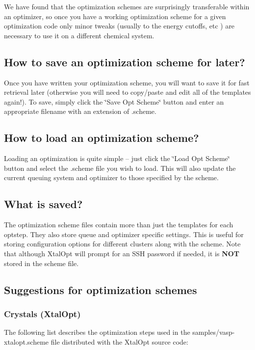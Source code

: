 We have found that the optimization schemes are surprisingly transferable within an optimizer, so once you have a working optimization scheme for a given optimization code only minor tweaks (usually to the energy cutoffs, etc ) are necessary to use it on a different chemical system.\hypertarget{optschemes_saving}{}\subsection{How to save an optimization scheme for later?}\label{optschemes_saving}
Once you have written your optimization scheme, you will want to save it for fast retrieval later (otherwise you will need to copy/paste and edit all of the templates again!). To save, simply click the \char`\"{}\+Save Opt
\+Scheme\char`\"{} button and enter an appropriate filename with an extension of .scheme.\hypertarget{optschemes_loading}{}\subsection{How to load an optimization scheme?}\label{optschemes_loading}
Loading an optimization is quite simple -- just click the \char`\"{}\+Load Opt
\+Scheme\char`\"{} button and select the .scheme file you wish to load. This will also update the current queuing system and optimizer to those specified by the scheme.\hypertarget{optschemes_format}{}\subsection{What is saved?}\label{optschemes_format}
The optimization scheme files contain more than just the templates for each optstep. They also store queue and optimizer specific settings. This is useful for storing configuration options for different clusters along with the scheme. Note that although Xtal\+Opt will prompt for an S\+S\+H password if needed, it is {\bfseries N\+O\+T} stored in the scheme file.\hypertarget{optschemes_suggest}{}\subsection{Suggestions for optimization schemes}\label{optschemes_suggest}
\hypertarget{optschemes_sug-xtal}{}\subsubsection{Crystals (\+Xtal\+Opt)}\label{optschemes_sug-xtal}
The following list describes the optimization steps used in the samples/vasp-\/xtalopt.\+scheme file distributed with the Xtal\+Opt source code\+:
